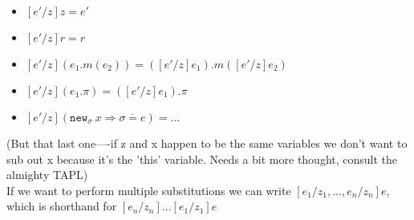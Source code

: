 \documentclass{llncs}
\newcommand{\keywadj}[1]{\mathtt{#1}}
\newcommand{\keyw}[1]{\keywadj{#1}~}
\begin{document}
\begin{itemize}
	\item $[e'/z]z = e'$
	\item $[e'/z]r = r$
	\item $[e'/z](e_1.m(e_2)) = ([e'/z]e_1).m([e'/z]e_2)$
	\item $[e'/z](e_1.\pi) = ([e'/z]e_1).\pi$
	\item $[e'/z](\keyw{new_\sigma} x \Rightarrow \overline {\sigma = e}) = ...$
\end{itemize}

\noindent
(But that last one----if z and x happen to be the same variables we don't want to sub out x because it's the 'this' variable. Needs a bit more thought, consult the almighty TAPL) \\

\noindent
If we want to perform multiple substitutions we can write $[e_1/z_1, ..., e_n/z_n]e$, which is shorthand for $[e_n/z_n]...[e_1/z_1]e$ \\
\end{document}
